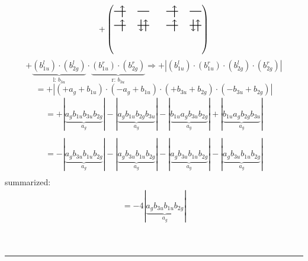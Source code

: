 \documentclass{article}
\begin{document}
\[+\left(\begin{tikzpicture}
    \draw[thick] (0,0) -- (0.5,0); %
    \draw[thick] (1,0) -- (1.5,0); %
    \draw[thick] (0,-0.6) -- (0.5,-0.6); %
    \draw[thick] (1,-0.6) -- (1.5,-0.6); %
\draw[->, thick] (0.35, -0.25) -- (0.35, 0.25); 
\draw[-> , thick] (0.35, -0.85) -- (0.35, -0.35); 
 \draw[-> , thick] (1.35, -0.85) -- (1.35, -0.35); 
\draw[<- , thick] (1.15, -0.85) -- (1.15, -0.35); 
\end{tikzpicture}\qquad \begin{tikzpicture}
    \draw[thick] (0,0) -- (0.5,0); %
    \draw[thick] (1,0) -- (1.5,0); %
    \draw[thick] (0,-0.6) -- (0.5,-0.6); %
    \draw[thick] (1,-0.6) -- (1.5,-0.6); %
\draw[->, thick] (0.35, -0.25) -- (0.35, 0.25); 
\draw[-> , thick] (0.35, -0.85) -- (0.35, -0.35); 
 \draw[-> , thick] (1.35, -0.85) -- (1.35, -0.35); 
\draw[<- , thick] (1.15, -0.85) -- (1.15, -0.35); 
\end{tikzpicture}\right)\]$$+ \underbrace{(b_{1u}^{l})\cdot (b_{2g}^{l})}_{\text{l: }b_{3u}}\cdot \underbrace{(b_{1u}^{r})\cdot (b_{2g}^{r})}_{\text{r: }b_{3u}}\Rightarrow +\left|(b_{1u}^{l}) \cdot (b_{1u}^{r}) \cdot (b_{2g}^{l}) \cdot (b_{2g}^{r})\right|$$$$=+\left|(+a_{g}+b_{1u}) \cdot (-a_{g}+b_{1u}) \cdot (+b_{3u}+b_{2g}) \cdot (-b_{3u}+b_{2g})\right|$$\begin{multline*}
=+\left|\underbrace{a_{g} b_{1u} b_{3u} b_{2g}}_{a_{g}}\right|-\left|\underbrace{a_{g} b_{1u} b_{2g} b_{3u}}_{a_{g}}\right|-\left|\underbrace{b_{1u} a_{g} b_{3u} b_{2g}}_{a_{g}}\right|+\left|\underbrace{b_{1u} a_{g} b_{2g} b_{3u}}_{a_{g}}\right|\\
\end{multline*}\begin{multline*}
=-\left|\underbrace{a_{g} b_{3u} b_{1u} b_{2g}}_{a_{g}}\right|-\left|\underbrace{a_{g} b_{3u} b_{1u} b_{2g}}_{a_{g}}\right|-\left|\underbrace{a_{g} b_{3u} b_{1u} b_{2g}}_{a_{g}}\right|-\left|\underbrace{a_{g} b_{3u} b_{1u} b_{2g}}_{a_{g}}\right|\\
\end{multline*}summarized:\begin{multline*}
=-4\left|\underbrace{a_{g} b_{3u} b_{1u} b_{2g}}_{a_{g}}\right|
\end{multline*}\\ \\
\hrule\newpage 
\end{document}
